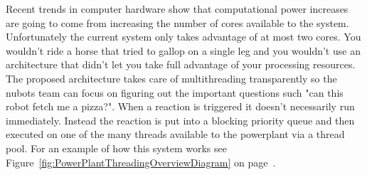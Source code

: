 \documentclass[english,12pt]{scrartcl}
\begin{document}
			Recent trends in computer hardware show that computational power increases are going
			to come from increasing the number of cores available to the system.
			Unfortunately the current system only takes advantage of at most two cores.
			You wouldn't ride a horse that tried to gallop on a single leg and you wouldn't use an architecture
			that didn't let you take full advantage of your processing resources.
			The proposed architecture takes care of multithreading transparently so the \gls{nubots} team can
			focus on figuring out the important questions such "can this robot fetch me a pizza?".
			When a reaction is triggered it doesn't necessarily run immediately.
			Instead the reaction is put into a blocking priority queue and then executed on one of the many threads
			available to the \gls{powerplant} via a thread pool.
			For an example of how this system works see Figure~\ref{fig:PowerPlantThreadingOverviewDiagram} on
			page~\pageref{fig:PowerPlantThreadingOverviewDiagram}.
\end{document}

